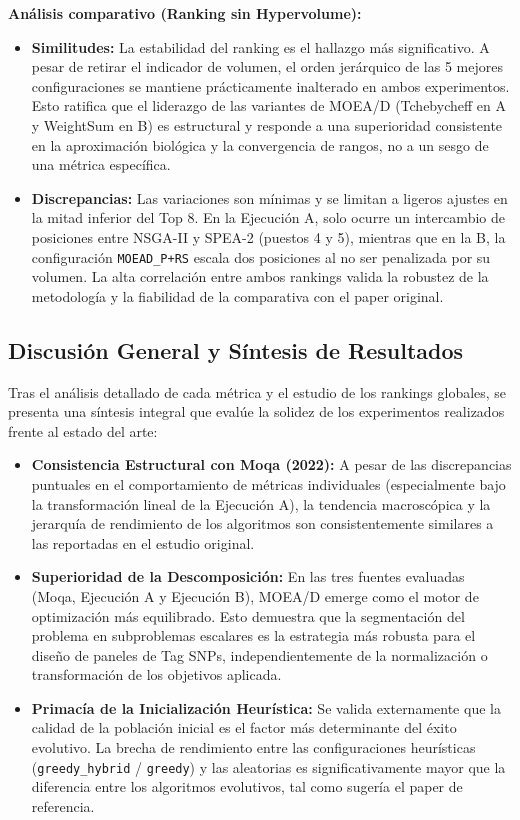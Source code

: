 \documentclass[a4paper,10pt]{article}
\begin{document}
\textbf{Análisis comparativo (Ranking sin Hypervolume):}
\begin{itemize}
    \item \textbf{Similitudes:} La estabilidad del ranking es el hallazgo más significativo. A pesar de retirar el indicador de volumen, el orden jerárquico de las 5 mejores configuraciones se mantiene prácticamente inalterado en ambos experimentos. Esto ratifica que el liderazgo de las variantes de MOEA/D (Tchebycheff en A y WeightSum en B) es estructural y responde a una superioridad consistente en la aproximación biológica y la convergencia de rangos, no a un sesgo de una métrica específica.
    \item \textbf{Discrepancias:} Las variaciones son mínimas y se limitan a ligeros ajustes en la mitad inferior del Top 8. En la Ejecución A, solo ocurre un intercambio de posiciones entre NSGA-II y SPEA-2 (puestos 4 y 5), mientras que en la B, la configuración \texttt{MOEAD\_P+RS} escala dos posiciones al no ser penalizada por su volumen. La alta correlación entre ambos rankings valida la robustez de la metodología y la fiabilidad de la comparativa con el paper original.
\end{itemize}

\subsection{Discusión General y Síntesis de Resultados}

Tras el análisis detallado de cada métrica y el estudio de los rankings globales, se presenta una síntesis integral que evalúe la solidez de los experimentos realizados frente al estado del arte:

\begin{itemize}
    \item \textbf{Consistencia Estructural con Moqa (2022):} A pesar de las discrepancias puntuales en el comportamiento de métricas individuales (especialmente bajo la transformación lineal de la Ejecución A), la tendencia macroscópica y la jerarquía de rendimiento de los algoritmos son consistentemente similares a las reportadas en el estudio original.
    \item \textbf{Superioridad de la Descomposición:} En las tres fuentes evaluadas (Moqa, Ejecución A y Ejecución B), MOEA/D emerge como el motor de optimización más equilibrado. Esto demuestra que la segmentación del problema en subproblemas escalares es la estrategia más robusta para el diseño de paneles de Tag SNPs, independientemente de la normalización o transformación de los objetivos aplicada.
    \item \textbf{Primacía de la Inicialización Heurística:} Se valida externamente que la calidad de la población inicial es el factor más determinante del éxito evolutivo. La brecha de rendimiento entre las configuraciones heurísticas (\texttt{greedy\_hybrid} / \texttt{greedy}) y las aleatorias es significativamente mayor que la diferencia entre los algoritmos evolutivos, tal como sugería el paper de referencia.
\end{itemize}
\end{document}
